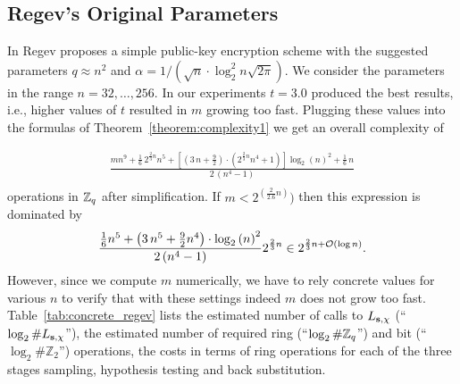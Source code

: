 \subsection{Regev's Original Parameters}\label{sec:parameters:regev}
In \cite{regev:acm09} Regev proposes a simple public-key encryption scheme with the suggested parameters $q \approx n^2$ and $\alpha = 1/(\sqrt{n} \cdot \log_2^2 n\sqrt{2\pi})$. We consider the parameters in the range $n=32,\dots,256$. In our experiments $t=3.0$ produced the best results, i.e., higher values of $t$ resulted in $m$ growing too fast. Plugging these values into the formulas of Theorem~\ref{theorem:complexity1} we get an overall complexity of 
\begin{comment}
sage: n, m = var('n,m')
sage: assume(n>0)
sage: assume(m>0)
sage: q = n^2
sage: t, d, r = 3, 2, 2
sage: a = t*log(n)
sage: b = n/a
sage: repeat = n/d
sage: corrector = (q**d)/(q**d - 1)
sage: stage1a = (q**b-1)/2.0 * ( a*(a-1)/2.0 * (n+1) - b*a*(a-1)/4.0 - b/6.0 * ( (a-1)**3 + 3/2.0*(a-1)**2 + 1/2.0*(a-1) ) )
sage: stage1b = corrector * (repeat + 1)/2.0 * m * (a/2.0 * (n + 2))
sage: stage1  = stage1a + stage1b
sage: stage2  = repeat * m * q**d
sage: stage3  = (repeat + 1) * d * a * q**b/2.0
sage: nops = stage1 + stage2 + stage3
sage: nops = nops.simplify_full()
sage: num = nops.numerator()
sage: den = nops.denominator()
sage: ops = num.operands()
sage: f = sum(op for op in ops if op >= 0)/den # we throw away things that only make it smaller
sage: f.simplify_full()
\end{comment}
\begin{eqnarray*}
\frac{mn^9 + \frac{1}{6} \, 2^{\frac{2}{3}n} n^5  + {\left[{\left(3\, n + \frac{9}{2}\right)} \cdot \left(2^{\frac{2}{3}n}n^4 + 1\right)\right]} \log_2\left(n\right)^{2} + \frac{1}{6} \, n}{2 \, {\left(n^4 -1\right)}}\\
\end{eqnarray*}
operations in $\mathbb{Z}_q$ after simplification.
If $m <2^{(\frac{2}{2.6}n)})$ then this expression is dominated by
$$\frac{\frac{1}{6} n^5 +  {\left(3 \, n^5 + \frac{9}{2}n^4\right)} \cdot \log_2\left(n\right)^2}{2 \, (n^4 - 1)} 2^{\frac{2}{3}n}\in 2^{\frac{2}{3}n + \mathcal{O}\left(\log n\right)}.$$
However, since we compute $m$ numerically, we have to rely concrete values for various $n$ to verify that with these settings indeed $m$ does not grow too fast. Table~\ref{tab:concrete_regev} lists the estimated number of calls to $L_{\mathbf{s},\chi}$ (``$\log_2 \#L_{\mathbf{s},\chi} $''), the estimated number of required ring (``$\log_2 \#\mathbb{Z}_q $'') and bit (``$\log_2 \#\mathbb{Z}_2 $'')  operations, the costs in terms of ring operations for each of the three stages sampling, hypothesis testing and back substitution.

